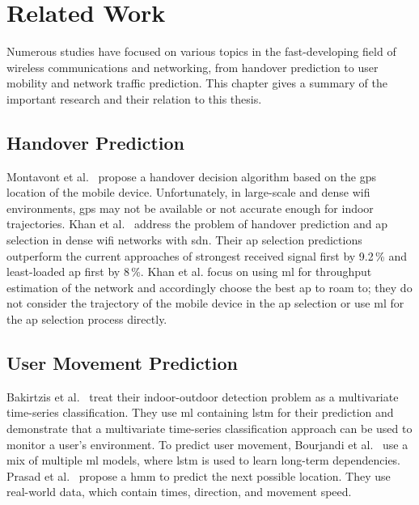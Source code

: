 \chapter{Related Work}\label{ch:related-work}

Numerous studies have focused on various topics in the fast-developing field of wireless communications and networking, from handover prediction to user mobility and network traffic prediction.
This chapter gives a summary of the important research and their relation to this thesis.


\section{Handover Prediction}

Montavont et al.~\cite{handover-assisted-by-gps} propose a handover decision algorithm based on the \ac{gps} location of the mobile device.
Unfortunately, in large-scale and dense \ac{wifi} environments, \ac{gps} may not be available or not accurate enough for indoor trajectories.
Khan et al.~\cite{MLBasedHandoverPrediction2022} address the problem of handover prediction and \ac{ap} selection in dense \ac{wifi} networks with \ac{sdn}.
Their \ac{ap} selection predictions outperform the current approaches of strongest received signal first by 9.2\,\% and least-loaded \ac{ap} first by 8\,\%.
Khan et al. focus on using \ac{ml} for throughput estimation of the network and accordingly choose the best \ac{ap} to roam to; they do not consider the trajectory of the mobile device in the \ac{ap} selection or use \ac{ml} for the \ac{ap} selection process directly.

\section{User Movement Prediction}

Bakirtzis et al.~\cite{multivariate-lstm-indoor-outdoor} treat their indoor-outdoor detection problem as a multivariate time-series classification.
They use \ac{ml} containing \ac{lstm} for their prediction and demonstrate that a multivariate time-series classification approach can be used to monitor a user's environment.
To predict user movement, Bourjandi et al.~\cite{bourjandiPredictingUserMovement2022} use a mix of multiple \ac{ml} models, where \ac{lstm} is used to learn long-term dependencies.
Prasad et al.~\cite{hmm-movement-prediction} propose a \ac{hmm} to predict the next possible location.
They use real-world data, which contain times, direction, and movement speed.

